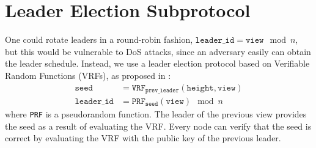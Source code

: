 \section{Leader Election Subprotocol}
\label{appendix:election}

One could rotate leaders in a round-robin fashion, $\texttt{leader\_id} = \texttt{view} \mod n$,
but this would be vulnerable to DoS attacks, since an adversary easily can obtain the leader schedule.
Instead, we use a leader election protocol based on Verifiable Random Functions (VRFs), as proposed in \cite{LibraBFT}:
\begin{align*}
    \texttt{seed} &= \texttt{VRF}_{\texttt{prev\_leader}}(\texttt{height}, \texttt{view}) \\
    \texttt{leader\_id} &= \texttt{PRF}_{\texttt{seed}}(\texttt{view}) \mod n
\end{align*}
where \texttt{PRF} is a pseudorandom function.
The leader of the previous view provides the seed as a result of evaluating the VRF.
Every node can verify that the seed is correct by evaluating the VRF with the public key of the previous leader.
